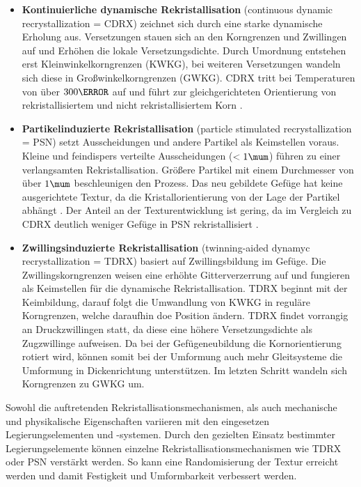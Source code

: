 \begin{itemize}
    \item \textbf{Kontinuierliche dynamische Rekristallisation} (continuous dynamic recrystallization = CDRX) zeichnet sich durch eine starke dynamische Erholung aus.
    Versetzungen stauen sich an den Korngrenzen und Zwillingen auf und Erhöhen die lokale Versetzungsdichte.
    Durch Umordnung entstehen erst Kleinwinkelkorngrenzen (KWKG), bei weiteren Versetzungen wandeln sich diese in Großwinkelkorngrenzen (GWKG).
    CDRX tritt bei Temperaturen von über $300 \degreeCelsius$ auf und führt zur gleichgerichteten Orientierung von rekristallisiertem und nicht rekristallisiertem Korn \cite{NarayanaMurty.2015}.
    \item \textbf{Partikelinduzierte Rekristallisation} (particle stimulated recrystallization = PSN) setzt Ausscheidungen und andere Partikel als Keimstellen voraus.
    Kleine und feindispers verteilte Ausscheidungen ($<1\mum$) führen zu einer verlangsamten Rekristallisation.
    Größere Partikel mit einem Durchmesser von über $1\mum$ beschleunigen den Prozess. \cite{Kittner.2019}
    Das neu gebildete Gefüge hat keine ausgerichtete Textur, da die Kristallorientierung von der Lage der Partikel abhängt \cite{Ullmann.2019}.
    Der Anteil an der Texturentwicklung ist gering, da im Vergleich zu CDRX deutlich weniger Gefüge in PSN rekristallisiert \cite{Ullmann.2014}.
    \item \textbf{Zwillingsinduzierte Rekristallisation} (twinning-aided dynamyc recrystallization = TDRX) basiert auf Zwillingsbildung im Gefüge.
    Die Zwillingskorngrenzen weisen eine erhöhte Gitterverzerrung auf und fungieren als Keimstellen für die dynamische Rekristallisation.
    TDRX beginnt mit der Keimbildung, darauf folgt die Umwandlung von KWKG in reguläre Korngrenzen, welche daraufhin doe Position ändern.
    TDRX findet vorrangig an Druckzwillingen statt, da diese eine höhere Versetzungsdichte als Zugzwillinge aufweisen.
    Da bei der Gefügeneubildung die Kornorientierung rotiert wird, können somit bei der Umformung auch mehr Gleitsysteme die Umformung in Dickenrichtung unterstützen.
    Im letzten Schritt wandeln sich Korngrenzen zu GWKG um. \cite{Kittner.2019}
\end{itemize}

Sowohl die auftretenden Rekristallisationsmechanismen, als auch mechanische und physikalische Eigenschaften variieren mit den eingesetzen Legierungselementen und -systemen.
Durch den gezielten Einsatz bestimmter Legierungselemente können einzelne Rekristallisationsmechanismen wie TDRX oder PSN verstärkt werden.
So kann eine Randomisierung der Textur erreicht werden und damit Festigkeit und Umformbarkeit verbessert werden.

